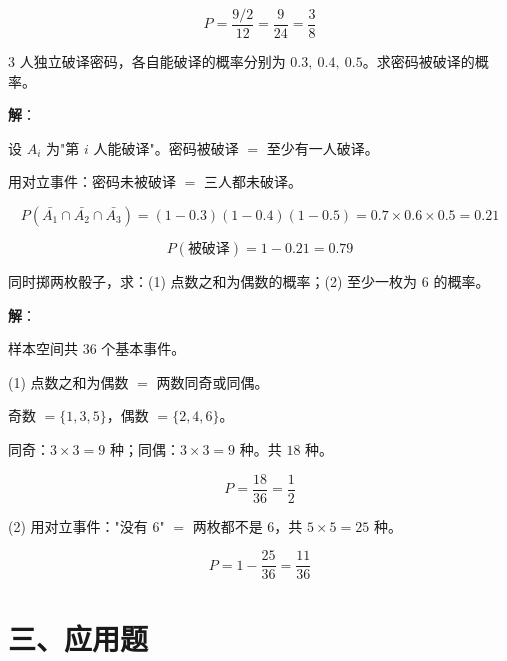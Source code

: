 \documentclass[12pt, a4paper]{ctexart}
\begin{document}
\[
P = \frac{9/2}{12} = \frac{9}{24} = \frac{3}{8}
\]

\begin{center}
\end{center}

\begin{examplebox}[【例9】对立事件综合]
$3$ 人独立破译密码，各自能破译的概率分别为 $0.3,\ 0.4,\ 0.5$。求密码被破译的概率。
\end{examplebox}

\textbf{解}：

设 $A_i$ 为"第 $i$ 人能破译"。密码被破译 $=$ 至少有一人破译。

用对立事件：密码未被破译 $=$ 三人都未破译。

\[
P(\bar{A_1} \cap \bar{A_2} \cap \bar{A_3}) = (1-0.3)(1-0.4)(1-0.5) = 0.7 \times 0.6 \times 0.5 = 0.21
\]

\[
P(\text{被破译}) = 1 - 0.21 = 0.79
\]

\begin{examplebox}
同时掷两枚骰子，求：(1) 点数之和为偶数的概率；(2) 至少一枚为 $6$ 的概率。
\end{examplebox}

\textbf{解}：

样本空间共 $36$ 个基本事件。

(1) 点数之和为偶数 $=$ 两数同奇或同偶。

奇数 $= \{1,3,5\}$，偶数 $= \{2,4,6\}$。

同奇：$3 \times 3 = 9$ 种；同偶：$3 \times 3 = 9$ 种。共 $18$ 种。

\[
P = \frac{18}{36} = \frac{1}{2}
\]

(2) 用对立事件："没有 $6$" $=$ 两枚都不是 $6$，共 $5 \times 5 = 25$ 种。

\[
P = 1 - \frac{25}{36} = \frac{11}{36}
\]

\section*{\textcolor{apppurple}{三、应用题}}
\end{document}
